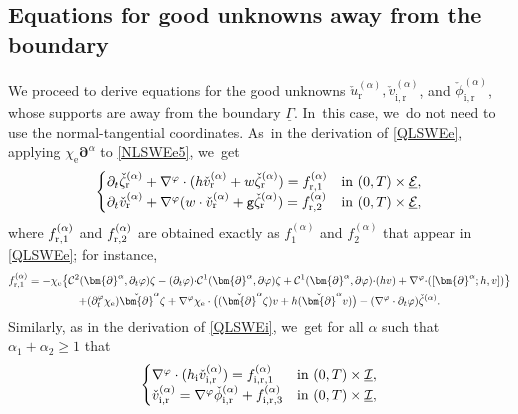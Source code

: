 \documentclass[10pt]{amsart}
\newcommand{\gr}{{\mathtt g}}
\newcommand{\dt}{\partial_t}
\newcommand{\cI}{{\mathcal I}}
\newcommand{\cE}{{\mathcal E}}
\newcommand{\ul}[1]{\underline{#1}}
\newcommand{\itGamma}{\mathit{\Gamma}}
\theoremstyle{definition}
\begin{document}
\subsection{Equations for good unknowns away from the boundary}\label{subsect:EqGUb}
We proceed to derive equations for the good unknowns $\check{u}_\mathrm{r}^{(\alpha)},\check{v}_\mathrm{i,r}^{(\alpha)}$, and $\check{\phi}_\mathrm{i,r}^{(\alpha)}$,
whose supports are away from the boundary $\ul{\itGamma}$. In~this case, we~do not need to use the normal-tangential coordinates. As~in the derivation of \eqref{QLSWEe}, applying $\chi_\mathrm{e}\bm{\partial}^\alpha$ to \eqref{NLSWEe5}, we~get
\begin{equation}\label{QLSWEr}
\begin{cases}
\dt\check{\zeta}_\mathrm{r}^{(\alpha)}+\nabla^\varphi\cdot(h\check{v}_\mathrm{r}^{(\alpha)}+w\check{\zeta}_\mathrm{r}^{(\alpha)}) = f_{{\rm r},1}^{(\alpha)}
&\text{in } (0,T)\times\ul{\cE}, \\
\dt\check{v}_\mathrm{r}^{(\alpha)}+\nabla^\varphi(w\cdot\check{v}_\mathrm{r}^{(\alpha)}+\gr\check{\zeta}_\mathrm{r}^{(\alpha)}) = f_{{\rm r},2}^{(\alpha)}
&\text{in } (0,T)\times\ul{\cE},
\end{cases}
\end{equation}
where $f_{{\rm r},1}^{(\alpha)}$ and $f_{{\rm r},2}^{(\alpha)}$ are obtained exactly as $f_{1}^{(\alpha)}$ and $f_{2}^{(\alpha)}$ that appear in \eqref{QLSWEe};
for instance,
\begin{multline*}
f_{{\rm r},1}^{(\alpha)}
= -\chi_\mathrm{e} \big\{ {\mathcal C}^2(\bm{\partial}^\alpha,\dt\varphi)\zeta
- (\dt\varphi){\cdot} {\mathcal C}^1(\bm{\partial}^\alpha,\partial\varphi)\zeta
+{\mathcal C}^1(\bm{\partial}^\alpha,\partial\varphi){\cdot} (hv)+ \nabla^\varphi{\cdot}([\bm{\partial}^\alpha;h,v]) \big\} \\
+ (\dt^\varphi\chi_\mathrm{e}) \check{\bm{\partial}}^\alpha\zeta
+ \nabla^\varphi\chi_\mathrm{e}\cdot\bigl((\check{\bm{\partial}}^\alpha \zeta)v + h (\check{\bm{\partial}}^\alpha v) \bigr)
- (\nabla^\varphi\cdot\dt\varphi)\check{\zeta}^{(\alpha)}.
\end{multline*}
Similarly, as in the derivation of \eqref{QLSWEi}, we~get for all $\alpha$ such that $\alpha_1+\alpha_2\geq 1$ that
\begin{equation}\label{QLSWEir}
\begin{cases}
\nabla^\varphi\cdot(h_\mathrm{i}\check{v}_\mathrm{i,r}^{(\alpha)}) = f_{{\rm i,r},1}^{(\alpha)} &\text{in } (0,T)\times\ul{\cI}, \\
\check{v}_\mathrm{i,r}^{(\alpha)} = \nabla^\varphi\check{\phi}_\mathrm{i,r}^{(\alpha)} + f_{{\rm i,r},3}^{(\alpha)} &\text{in } (0,T)\times\ul{\cI},
\end{cases}
\end{equation}
\end{document}
